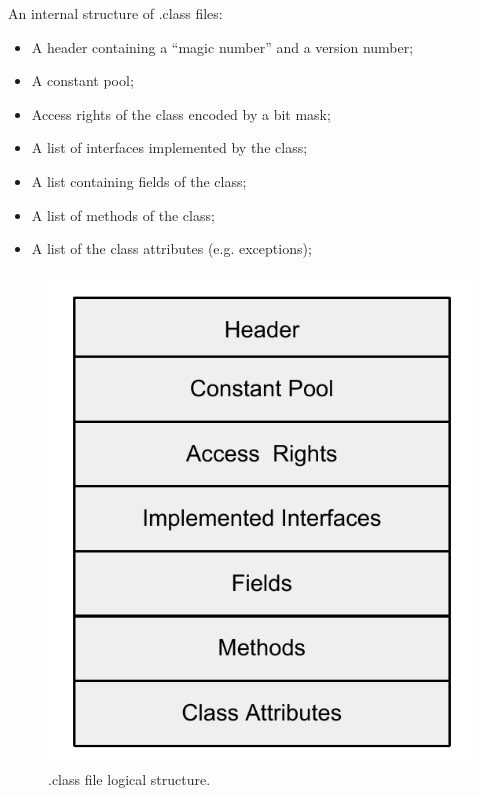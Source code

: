 \documentclass[11pt, oneside]{article}   	%
\begin{document}
An internal structure of .class files\cite{dot_class_structure}:
\begin{itemize}
\itemsep0pt
  \item A header containing a ``magic number'' and a version number;
  \item A constant pool;
  \item Access rights of the class encoded by a bit mask;
  \item A list of interfaces implemented by the class;
  \item A list containing fields of the class;
  \item A list of methods of the class;
  \item A list of the class attributes (e.g. exceptions);
\end{itemize}

\begin{figure}[h]
\centering
\begin{minipage}{.4\textwidth}
\includegraphics[width=\textwidth]{./images/dot_class_file_structure.pdf}
\caption{.class file logical structure.}
\label{fig:dot_class_internals}
\end{minipage}

\end{figure}
\end{document}
